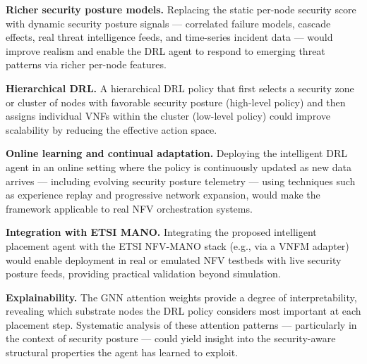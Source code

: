 \textbf{Richer security posture models.} Replacing the static per-node security score with dynamic security posture signals — correlated failure models, cascade effects, real threat intelligence feeds, and time-series incident data — would improve realism and enable the DRL agent to respond to emerging threat patterns via richer per-node features.

\textbf{Hierarchical DRL.} A hierarchical DRL policy that first selects a security zone or cluster of nodes with favorable security posture (high-level policy) and then assigns individual VNFs within the cluster (low-level policy) could improve scalability by reducing the effective action space.

\textbf{Online learning and continual adaptation.} Deploying the intelligent DRL agent in an online setting where the policy is continuously updated as new data arrives — including evolving security posture telemetry — using techniques such as experience replay and progressive network expansion, would make the framework applicable to real NFV orchestration systems.

\textbf{Integration with ETSI MANO.} Integrating the proposed intelligent placement agent with the ETSI NFV-MANO stack (e.g., via a VNFM adapter) would enable deployment in real or emulated NFV testbeds with live security posture feeds, providing practical validation beyond simulation.

\textbf{Explainability.} The GNN attention weights provide a degree of interpretability, revealing which substrate nodes the DRL policy considers most important at each placement step. Systematic analysis of these attention patterns — particularly in the context of security posture — could yield insight into the security-aware structural properties the agent has learned to exploit.

